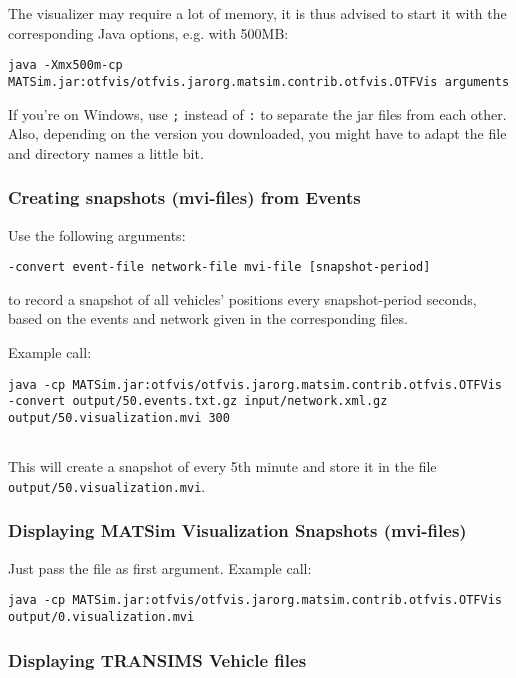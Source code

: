 \documentclass[a4paper,11pt]{report}
\begin{document}
The visualizer may require a lot of memory, it is thus advised to start it with the corresponding Java options, e.g. with 500MB:
\begin{verbatim}
java -Xmx500m-cp MATSim.jar:otfvis/otfvis.jarorg.matsim.contrib.otfvis.OTFVis arguments
\end{verbatim}

If you're on Windows, use 
\texttt{;} instead of 
\texttt{:} to  separate the jar files from each other. Also, depending on the version  you downloaded, you might have to adapt the file and directory names a  little bit.  

\subsubsection{Creating snapshots (mvi-files) from Events}

Use the following arguments:
\begin{verbatim}
-convert event-file network-file mvi-file [snapshot-period]
\end{verbatim}

to record a snapshot of all vehicles' positions every snapshot-period  seconds, based on the events and network given in the corresponding  files.

Example call:
\begin{verbatim}
java -cp MATSim.jar:otfvis/otfvis.jarorg.matsim.contrib.otfvis.OTFVis -convert output/50.events.txt.gz input/network.xml.gz output/50.visualization.mvi 300


\end{verbatim}

This will create a snapshot of every 5th minute and store it in the file 
\texttt{output/50.visualization.mvi}.

\subsubsection{Displaying MATSim Visualization Snapshots (mvi-files)}

Just pass the file as first argument. Example call:
\begin{verbatim}
java -cp MATSim.jar:otfvis/otfvis.jarorg.matsim.contrib.otfvis.OTFVis output/0.visualization.mvi
\end{verbatim}

\subsubsection{Displaying TRANSIMS Vehicle files}
\end{document}
